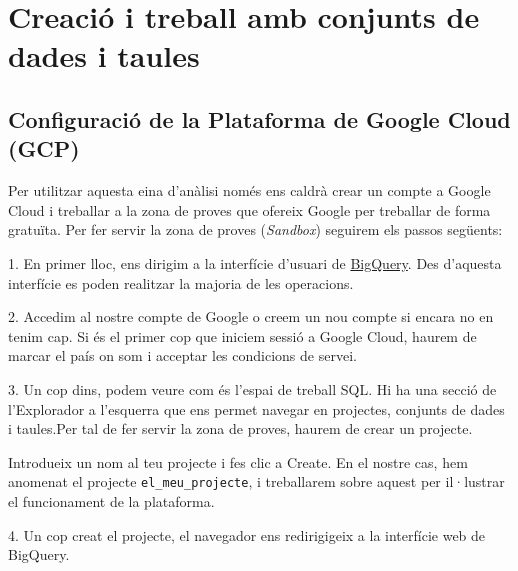 \documentclass[12pt,longbibliography]{article}
\theoremstyle{definition}
\theoremstyle{remark}
\begin{document}
\pagebreak

\section{Creació i treball amb conjunts de dades i taules}

\subsection{Configuració de la Plataforma de Google Cloud (GCP)}

\graphicspath{ {BigQuery/Imatges tutorial/} }

Per utilitzar aquesta eina d’anàlisi només ens caldrà crear un compte a Google Cloud i treballar a la zona de proves que ofereix Google per treballar de forma gratuïta.
Per fer servir la zona de proves (\textit{Sandbox}) seguirem els passos següents: 

1. En primer lloc, ens dirigim a la interfície d’usuari de \href{https://console.cloud.google.com}{BigQuery}. Des d'aquesta interfície es poden realitzar la majoria de les operacions.

\vspace{2mm}

2. Accedim al nostre compte de Google o creem un nou compte si encara no en tenim cap. Si és el primer cop que iniciem sessió a Google Cloud, haurem de marcar el país on som i acceptar les condicions de servei.

\vspace{2mm}

3. Un cop dins, podem veure com és l'espai de treball SQL. Hi ha una secció de l'Explorador a l'esquerra que ens permet navegar en projectes, conjunts de dades i taules.Per tal de fer servir la zona de proves, haurem de crear un projecte.

Introdueix un nom al teu projecte i fes clic a Create. En el nostre cas, hem anomenat el projecte \verb|el_meu_projecte|, i treballarem sobre aquest per il·lustrar el funcionament de la plataforma.
\vspace{2mm}
\par
{}%
\hfill
{}%
\par
\vspace{2mm}
4. Un cop creat el projecte, el navegador ens redirigigeix a la interfície web de BigQuery.
\end{document}
